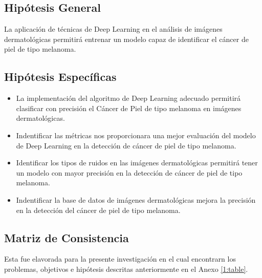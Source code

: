 \subsection{Hipótesis General}
\newcommand{\HipotesisGeneral}{
La aplicación de técnicas de Deep Learning en el análisis de imágenes dermatológicas permitirá entrenar un modelo capaz de identificar  el cáncer de piel de tipo melanoma.
}
\HipotesisGeneral
\subsection{Hipótesis Específicas}
\newcommand{\Hone}{
La implementación del algoritmo de Deep Learning adecuado permitirá clasificar con  precisión el Cáncer de Piel de tipo melanoma en imágenes dermatológicas.
	
}
\newcommand{\Htwo}{
Indentificar las métricas nos proporcionara una mejor evaluación del modelo de Deep Learning en la detección de cáncer de piel de tipo melanoma.
	
}
\newcommand{\Hthree}{
Identificar los tipos de ruidos en las imágenes dermatológicas permitirá tener un modelo con mayor precisión en la  detección de cáncer de piel de tipo melanoma.
		
}
\newcommand{\Hfour}{
Indentificar la base de datos de imágenes dermatológicas mejora la precisión en la  detección del  cáncer de piel de tipo melanoma.
	
}

\begin{itemize}
	\item \Hone
	\item \Htwo
	\item \Hthree
	\item \Hfour
\end{itemize}

\subsection{Matriz de Consistencia}

Esta fue elavorada para la presente investigación en el cual encontrarn los problemas, objetivos e hipótesis descritas anteriormente en el Anexo \ref{1:table}.



